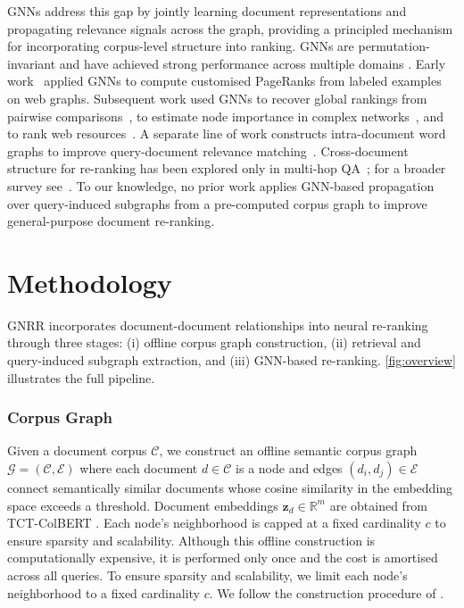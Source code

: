\documentclass[runningheads]{llncs}
\newcommand{\ModelName}{\textsc{GNRR}\xspace}
\begin{document}
GNNs address this gap by jointly learning document representations and propagating relevance signals across the graph, providing a principled mechanism for incorporating corpus-level structure into ranking. GNNs are permutation-invariant \cite{messagepassing,everythingisconnected} and have achieved strong performance across multiple domains \cite{recsystem1,NMT1,VQA}. Early work~\cite{scarselli2005graph} applied GNNs to compute customised PageRanks from labeled examples on web graphs. Subsequent work used GNNs to recover global rankings from pairwise comparisons~\cite{damke2021ranking,he2022gnnrank}, to estimate node importance in complex networks~\cite{liu2022learning,qu2023gnr}, and to rank web resources~\cite{ergashev2023learning}. A separate line of work constructs intra-document word graphs to improve query-document relevance matching~\cite{graphofwords,graphofwords2}. Cross-document structure for re-ranking has been explored only in multi-hop QA~\cite{nie2021answeringanyhopopendomainquestions}; for a broader survey see~\cite{zaoad2025graphbasedrerankingemergingtechniques}. To our knowledge, no prior work applies GNN-based propagation over query-induced subgraphs from a pre-computed corpus graph to improve general-purpose document re-ranking.

\section{Methodology}
\label{sec:methodology}

\ModelName incorporates document-document relationships into neural re-ranking through three stages: (i) offline corpus graph construction, (ii) retrieval and query-induced subgraph extraction, and (iii) GNN-based re-ranking. \cref{fig:overview} illustrates the full pipeline.

\subsubsection*{\textbf{Corpus Graph}}
Given a document corpus $\mathcal{C}$, we construct an offline semantic corpus graph $\mathcal{G} = (\mathcal{C}, \mathcal{E})$ where each document $d \in \mathcal{C}$ is a node and edges $(d_i,d_j) \in \mathcal{E}$ connect semantically similar documents whose cosine similarity in the embedding space exceeds a threshold. Document embeddings $\mathbf{z}_d \in \mathbb{R}^m$ are obtained from TCT-ColBERT \cite{tctcolbert}. Each node's neighborhood is capped at a fixed cardinality $c$ to ensure sparsity and scalability. Although this offline construction is computationally expensive, it is performed only once and the cost is amortised across all queries. To ensure sparsity and scalability, we limit each node's neighborhood to a fixed cardinality $c$.
We follow the construction procedure of \cite{corpusgraph}.
\end{document}

